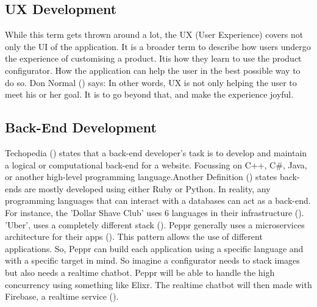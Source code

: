 \subsection{UX Development}
While this term gets thrown around a lot, the UX (User Experience) covers not only the UI of the application. It is a broader term to describe how users undergo the experience of customising a product. Itis how they learn to use the product configurator. How the application can help the user in the best possible way to do so. Don Normal (\citet{User Experience}) says: \newline
{} \newline
In other words, UX is not only helping the user to meet his or her goal. It is to go beyond that, and make the experience joyful.

\subsection{Back-End Development}
Techopedia (\citet{Back-End Developer Definition}) states that a back-end developer's task is to develop and maintain a logical or computational back-end for a website. Focussing on C++, C\#, Java, or another high-level programming language.Another Definition (\citet{Back-End Developer Definition 02}) states back-ends are mostly developed using either Ruby or Python.
In reality, any programming languages that can interact with a databases can act as a back-end. For instance, the 'Dollar Shave Club' uses 6 languages in their infrastructure (\citet{Dollar Shave Club back-end}). 'Uber', uses a completely different stack (\citet{Uber back-end}).
Peppr generally uses a microservices architecture for their apps (\citet{Microservices}). This pattern allows the use of different applications. So, Peppr can build each application using a specific language and with a specific target in mind. So imagine a configurator needs to stack images but also needs a realtime chatbot. Peppr will be able to handle the high concurrency using something like Elixr. The realtime chatbot will then made with Firebase, a realtime service (\citet{Firebase}).

